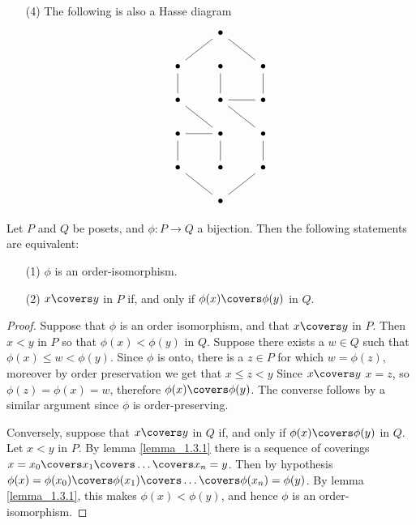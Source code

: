\begin{example}
\begin{enumerate}
    \item[(4)] The following is also a Hasse diagram
      \[\begin{tikzcd}
  & \bullet \\
        \bullet & \bullet & \bullet \\
        \bullet & \bullet & \bullet \\
        \bullet & \bullet & \bullet \\
        \bullet & \bullet & \bullet \\
                & \bullet
                \arrow[no head, from=1-2, to=2-3]
                \arrow[no head, from=2-1, to=1-2]
                \arrow[no head, from=2-1, to=3-1]
                \arrow[no head, from=2-2, to=3-2]
                \arrow[no head, from=2-3, to=3-3]
                \arrow[no head, from=3-1, to=4-2]
                \arrow[no head, from=3-2, to=4-3]
                \arrow[no head, from=3-3, to=3-2]
                \arrow[no head, from=4-1, to=4-2]
                \arrow[no head, from=4-1, to=5-1]
                \arrow[no head, from=4-2, to=5-2]
                \arrow[no head, from=4-3, to=5-3]
                \arrow[no head, from=5-1, to=6-2]
                \arrow[no head, from=6-2, to=5-3]
      \end{tikzcd}\]
  \end{enumerate}
\end{example}

\pagebreak

\begin{lemma}\label{lemma_1.3.2}
  Let $P$ and $Q$ be posets, and $\phi:P \xrightarrow{} Q$ a
  bijection. Then the following statements are equivalent:
  \begin{enumerate}
    \item[(1)] $\phi$ is an order-isomorphism.

    \item[(2)] $x \covers y$ in $P$ if, and only if $\phi(x) \covers
      \phi(y)$ in $Q$.
  \end{enumerate}
\end{lemma}
\begin{proof}
  Suppose that $\phi$ is an order isomorphism, and that $x \covers y$
  in $P$. Then $x<y$ in $P$ so that  $\phi(x)<\phi(y)$ in $Q$. Suppose
  there exists a $w \in Q$ such that $\phi(x) \leq w<\phi(y)$.
  Since $\phi$ is onto, there is a $z \in P$ for
  which $w=\phi(z)$, moreover by order preservation we get that $x
  \leq z<y$ Since $x \covers y$ $x=z$, so $\phi(z)=\phi(x)=w$,
  therefore $\phi(x) \covers \phi(y)$. The converse follows by a
  similar argument since $\phi$ is order-preserving.

  Conversely, suppose that $x \covers y$ in  $Q$ if, and only if
  $\phi(x) \covers \phi(y)$ in $Q$. Let $x<y$ in $P$. By lemma
  \ref{lemma_1.3.1} there is a sequence of coverings $x=x_0 \covers
  x_1 \covers \dots \covers x_n=y$. Then by hypothesis
  $\phi(x)=\phi(x_0) \covers \phi(x_1) \covers \dots \covers
  \phi(x_n)=\phi(y)$. By lemma \ref{lemma_1.3.1}, this makes
  $\phi(x)<\phi(y)$, and hence $\phi$ is an order-isomorphism.
\end{proof}

